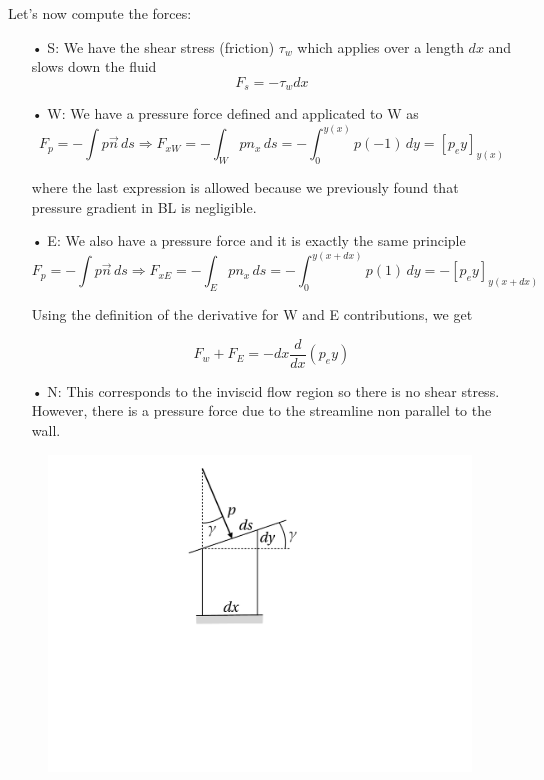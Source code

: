 Let's now compute the forces:\\

\begin{itemize}
\item[•] S: We have the shear stress (friction) $\tau_w$ which applies over a length $dx$ and slows down the fluid
\begin{equation}
	F_s = -\tau_w dx
\end{equation}  

\item[•] W: We have a pressure force defined and applicated to W as
\begin{equation}
F_p=- \int p \vec{n} \, d s \Rightarrow  F_{xW}=- \int_W p n_x\, d s=-\int_0^{y(x)} p (-1) \, dy=[p_e y]_{y(x)}
\end{equation}

where the last expression is allowed because we previously found that pressure gradient in BL is negligible. \\

\item[•] E: We also have a pressure force and it is exactly the same principle
\begin{equation}
F_p=- \int p \vec{n} \,d s \Rightarrow  F_{xE}=- \int_E p n_x \,d s=-\int_0^{y(x+dx)} p (1) \, dy=-[p_e y]_{y(x+dx)}
\end{equation}
	
Using the definition of the derivative for W and E contributions, we get

\begin{equation}
F_w+F_E=- dx \frac{d}{dx} (p_e y)
\end{equation}

\item[•] N: This corresponds to the inviscid flow region so there is no shear stress. However, there is a pressure force due to the streamline non parallel to the wall.\\
\end{itemize}

\begin{figure}
\vspace{-7mm}
\includegraphics[scale=0.25]{ch5/17} 
\end{figure}

